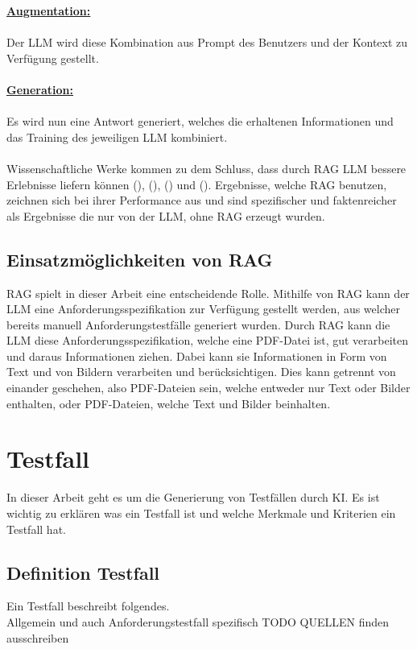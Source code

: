 \documentclass[12pt,toc=bib,toc=listof]{scrreprt}
\begin{document}
\textbf{\underline{Augmentation:}}\\
\\
Der LLM wird diese Kombination aus Prompt des Benutzers und der Kontext zu Verfügung gestellt.\\
\\
\textbf{\underline{Generation:}}\\
\\
Es wird nun eine Antwort generiert, welches die erhaltenen Informationen und das Training des jeweiligen LLM kombiniert.\\
\\
Wissenschaftliche Werke kommen zu dem Schluss, dass durch RAG LLM bessere Erlebnisse liefern können (\cite{Gao2024}), (\cite{Lewis2021}), (\cite{Salemi2024}) und (\cite{Wu2024}). Ergebnisse, welche RAG benutzen, zeichnen sich bei ihrer Performance aus und sind spezifischer und faktenreicher als Ergebnisse die nur von der LLM, ohne RAG erzeugt wurden.

\subsection{Einsatzmöglichkeiten von RAG} %
\label{sec:einsatzmöglichkeitenVonRAG}
RAG spielt in dieser Arbeit eine entscheidende Rolle. Mithilfe von RAG kann der LLM eine Anforderungsspezifikation zur Verfügung gestellt werden, aus welcher bereits manuell Anforderungstestfälle generiert wurden. Durch RAG kann die LLM diese Anforderungsspezifikation, welche eine PDF-Datei ist, gut verarbeiten und daraus Informationen ziehen. Dabei kann sie Informationen in Form von Text und von Bildern verarbeiten und berücksichtigen. Dies kann getrennt von einander geschehen, also PDF-Dateien sein, welche entweder nur Text oder Bilder enthalten, oder PDF-Dateien, welche Text und Bilder beinhalten.

\section{Testfall} %
\label{sec:testfall}
In dieser Arbeit geht es um die Generierung von Testfällen durch KI. Es ist wichtig zu erklären was ein Testfall ist und welche Merkmale und Kriterien ein Testfall hat. 

\subsection{Definition Testfall} %
\label{sec:definitionTestfall}
Ein Testfall beschreibt folgendes.\\
Allgemein und auch Anforderungstestfall spezifisch
TODO QUELLEN finden ausschreiben
\end{document}
